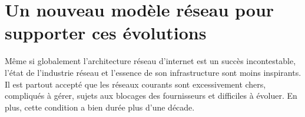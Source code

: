 \section{Un nouveau modèle réseau pour supporter ces évolutions}


Même si globalement l'architecture réseau d'internet est un succès incontestable, l'état de l'industrie réseau et l'essence de son infrastructure sont moins inspirants. Il est partout accepté que les réseaux courants sont excessivement chers, compliqués à gérer, sujets aux blocages des fournisseurs et difficiles à évoluer. En plus, cette condition a bien durée plus d'une décade. \cite{fabricIntro}



